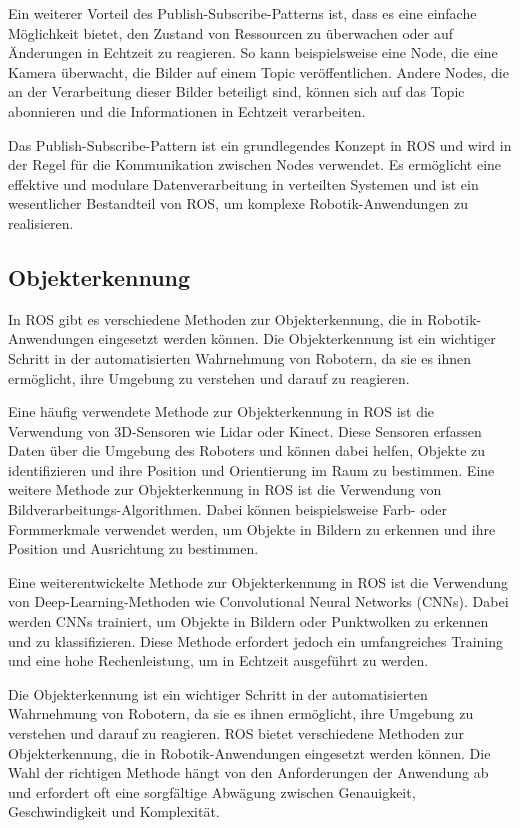     Ein weiterer Vorteil des Publish-Subscribe-Patterns ist, dass es eine einfache Möglichkeit bietet, den Zustand von Ressourcen zu überwachen oder auf Änderungen in Echtzeit zu reagieren. So kann beispielsweise eine Node, die eine Kamera überwacht, die Bilder auf einem Topic veröffentlichen. Andere Nodes, die an der Verarbeitung dieser Bilder beteiligt sind, können sich auf das Topic abonnieren und die Informationen in Echtzeit verarbeiten.

    Das Publish-Subscribe-Pattern ist ein grundlegendes Konzept in \ac{ROS} und wird in der Regel für die Kommunikation zwischen Nodes verwendet. Es ermöglicht eine effektive und modulare Datenverarbeitung in verteilten Systemen und ist ein wesentlicher Bestandteil von \ac{ROS}, um komplexe Robotik-Anwendungen zu realisieren.

    \subsection{Objekterkennung} \label{objekterkennung:subsection}
    In \ac{ROS} gibt es verschiedene Methoden zur Objekterkennung, die in Robotik-Anwendungen eingesetzt werden können. Die Objekterkennung ist ein wichtiger Schritt in der automatisierten Wahrnehmung von Robotern, da sie es ihnen ermöglicht, ihre Umgebung zu verstehen und darauf zu reagieren.

    Eine häufig verwendete Methode zur Objekterkennung in \ac{ROS} ist die Verwendung von 3D-Sensoren wie Lidar oder Kinect. Diese Sensoren erfassen Daten über die Umgebung des Roboters und können dabei helfen, Objekte zu identifizieren und ihre Position und Orientierung im Raum zu bestimmen.
    Eine weitere Methode zur Objekterkennung in \ac{ROS} ist die Verwendung von Bildverarbeitungs-Algorithmen. Dabei können beispielsweise Farb- oder Formmerkmale verwendet werden, um Objekte in Bildern zu erkennen und ihre Position und Ausrichtung zu bestimmen.

    Eine weiterentwickelte Methode zur Objekterkennung in \ac{ROS} ist die Verwendung von Deep-Learning-Methoden wie Convolutional Neural Networks (CNNs). Dabei werden CNNs trainiert, um Objekte in Bildern oder Punktwolken zu erkennen und zu klassifizieren. Diese Methode erfordert jedoch ein umfangreiches Training und eine hohe Rechenleistung, um in Echtzeit ausgeführt zu werden.

    Die Objekterkennung ist ein wichtiger Schritt in der automatisierten Wahrnehmung von Robotern, da sie es ihnen ermöglicht, ihre Umgebung zu verstehen und darauf zu reagieren. \ac{ROS} bietet verschiedene Methoden zur Objekterkennung, die in Robotik-Anwendungen eingesetzt werden können. Die Wahl der richtigen Methode hängt von den Anforderungen der Anwendung ab und erfordert oft eine sorgfältige Abwägung zwischen Genauigkeit, Geschwindigkeit und Komplexität.

